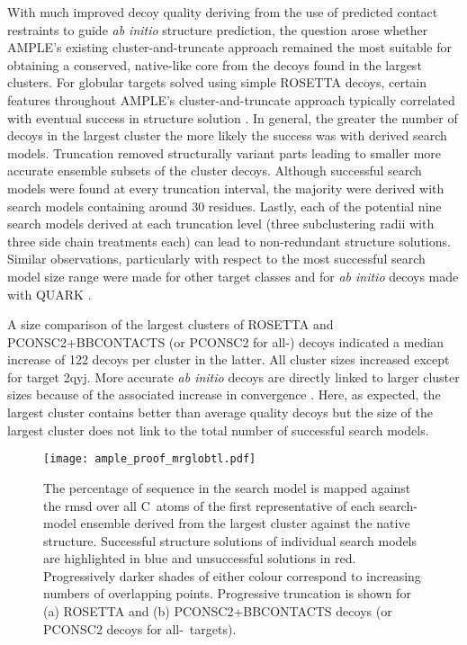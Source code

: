 With much improved decoy quality deriving from the use of predicted contact restraints to guide \textit{ab initio} structure prediction, the question arose whether AMPLE's existing cluster-and-truncate approach remained the most suitable for obtaining a conserved, native-like core from the decoys found in the largest clusters. For globular targets solved using simple ROSETTA decoys, certain features throughout AMPLE's cluster-and-truncate approach typically correlated with eventual success in structure solution \cite{Bibby2012-lm}. In general, the greater the number of decoys in the largest cluster the more likely the success was with derived search models. Truncation removed structurally variant parts leading to smaller more accurate ensemble subsets of the cluster decoys. Although successful search models were found at every truncation interval, the majority were derived with search models containing around 30 residues. Lastly, each of the potential nine search models derived at each truncation level (three subclustering radii with three side chain treatments each) can lead to non-redundant structure solutions. Similar observations, particularly with respect to the most successful search model size range were made for other target classes \cite{Thomas2017-sh,Thomas2015-wu} and for \textit{ab initio} decoys made with QUARK \cite{Keegan2015-zb}.

A size comparison of the largest clusters of ROSETTA and PCONSC2+BBCONTACTS (or PCONSC2 for all-\textalpha) decoys indicated a median increase of 122 decoys per cluster in the latter. All cluster sizes increased except for target 2qyj. More accurate \textit{ab initio} decoys are directly linked to larger cluster sizes because of the associated increase in convergence \cite{Simons1997-oe}. Here, as expected, the largest cluster contains better than average quality decoys but the size of the largest cluster does not link to the total number of successful search models.  

\begin{figure}[H]
    \centering
    \texttt{[image: ample\_proof\_mrglobtl.pdf]}
    \caption[Effect of progressive truncation on RMSD of ensemble centroid]{The percentage of sequence in the search model is mapped against the \gls{rmsd} over all C\textalpha\ atoms of the first representative of each search-model ensemble derived from the largest cluster against the native structure. Successful structure solutions of individual search models are highlighted in blue and unsuccessful solutions in red.  Progressively darker shades of either colour correspond to increasing numbers of overlapping points.  Progressive truncation is shown for (a) ROSETTA and (b) PCONSC2+BBCONTACTS decoys (or PCONSC2 decoys for all-\textalpha\ targets).}
    \label{fig:ample_proof_mrglobtl}
\end{figure}

